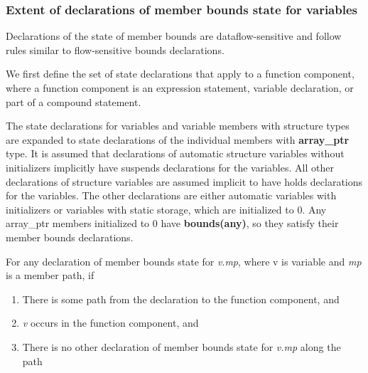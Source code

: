 \documentclass[]{article}
\begin{document}
\subsubsection{\texorpdfstring{\protect\hypertarget{ux5fToc435434979}{}{\protect\hypertarget{ux5fToc437460810}{}{\protect\hypertarget{ux5fToc440445491}{}{\protect\hypertarget{ux5fToc440449273}{}{\protect\hypertarget{ux5fToc440551923}{}{\protect\hypertarget{ux5fToc420589200}{}{\protect\hypertarget{ux5fToc422906991}{}{\protect\hypertarget{ux5fToc424307706}{}{\protect\hypertarget{ux5fToc426641096}{}{}}}}}}}}}Extent
of declarations of member bounds state for
variables}{Extent of declarations of member bounds state for variables}}\label{extent-of-declarations-of-member-bounds-state-for-variables}

Declarations of the state of member bounds are dataflow-sensitive and
follow rules similar to flow-sensitive bounds declarations.

We first define the set of state declarations that apply to a function
component, where a function component is an expression statement,
variable declaration, or part of a compound statement.

The state declarations for variables and variable members with structure
types are expanded to state declarations of the individual members with
\textbf{array\_ptr} type. It is assumed that declarations of automatic
structure variables without initializers implicitly have suspends
declarations for the variables. All other declarations of structure
variables are assumed implicit to have holds declarations for the
variables. The other declarations are either automatic variables with
initializers or variables with static storage, which are initialized to
0. Any array\_ptr members initialized to 0 have \textbf{bounds(any)}, so
they satisfy their member bounds declarations.

For any declaration of member bounds state for \emph{v}.\emph{mp}, where
v is variable and \emph{mp} is a member path, if

\begin{enumerate}
\def\labelenumi{\arabic{enumi}.}
\item
  There is some path from the declaration to the function component, and
\item
  \emph{v} occurs in the function component, and
\item
  There is no other declaration of member bounds state for \emph{v.mp}
  along the path
\end{enumerate}
\end{document}
